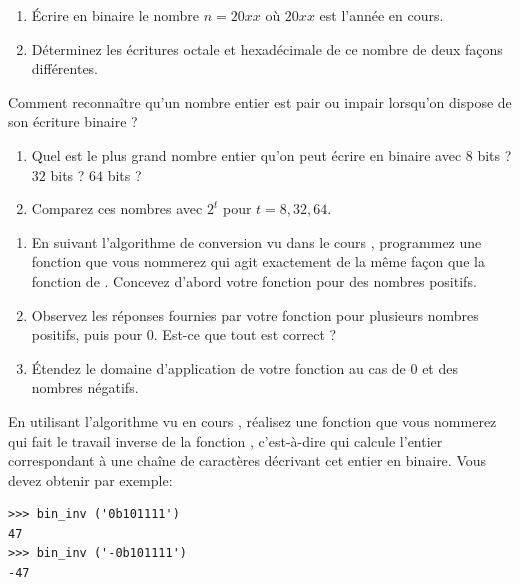 \documentclass[class=report,crop=false]{standalone}
\begin{document}
\begin{exercicecours}[Écritures]
\sauteligne
\begin{enumerate}
  \item Écrire en binaire le nombre $n=20xx$ où $20xx$ est l'année en cours.
  \item Déterminez les écritures octale et hexadécimale de ce nombre de deux façons différentes.
\end{enumerate}
\end{exercicecours}


\begin{exercicecours}
Comment reconnaître qu'un nombre entier est pair ou impair lorsqu'on
dispose de son écriture binaire ?  
\end{exercicecours}


\begin{exercicecours}
\sauteligne
\begin{enumerate}
  \item Quel est le plus grand nombre entier qu'on peut écrire en binaire avec $8$ bits ? $32$ bits ? $64$ bits ?
  \item Comparez ces nombres avec $2^t$ pour $t=8, 32, 64$.
\end{enumerate}
\end{exercicecours}


\begin{exercicecours}
\sauteligne
\begin{enumerate}
  \item En suivant l'algorithme de conversion
  vu dans le cours , programmez une
  fonction que vous nommerez  qui agit exactement de la
  même façon que la fonction  de \Python. Concevez d'abord
  votre fonction pour des nombres positifs.
  \item Observez les réponses fournies par votre fonction pour plusieurs
  nombres positifs, puis pour 0. Est-ce que tout est correct ?
  \item Étendez le domaine d'application de votre fonction au cas de 0 et des
  nombres négatifs.
\end{enumerate}
\end{exercicecours}


\begin{exercicecours}
En utilisant l'algorithme vu en cours , réalisez une
fonction que vous nommerez  qui fait le travail inverse
de la fonction , c'est-à-dire qui calcule l'entier
correspondant à une chaîne de caractères décrivant cet entier en
binaire. Vous devez obtenir par exemple:
\begin{lstlisting}
>>> bin_inv ('0b101111')
47  
>>> bin_inv ('-0b101111')
-47
\end{lstlisting}
\end{exercicecours}
\end{document}
